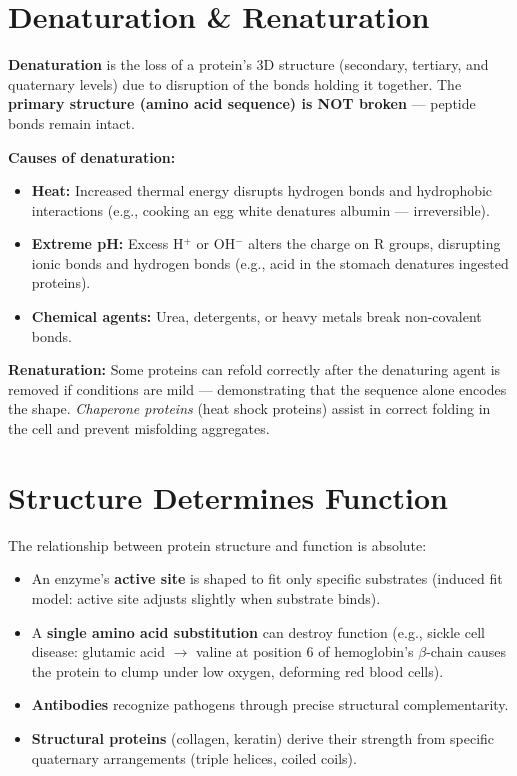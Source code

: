 \documentclass[11pt, letterpaper]{article}
\begin{document}
\section*{Denaturation \& Renaturation}

\textbf{Denaturation} is the loss of a protein's 3D structure (secondary, tertiary, and
quaternary levels) due to disruption of the bonds holding it together. The \textbf{primary
structure (amino acid sequence) is NOT broken} --- peptide bonds remain intact.

\textbf{Causes of denaturation:}
\begin{itemize}[noitemsep]
  \item \textbf{Heat:} Increased thermal energy disrupts hydrogen bonds and hydrophobic
        interactions (e.g., cooking an egg white denatures albumin --- irreversible).
  \item \textbf{Extreme pH:} Excess H$^+$ or OH$^-$ alters the charge on R groups, disrupting
        ionic bonds and hydrogen bonds (e.g., acid in the stomach denatures ingested proteins).
  \item \textbf{Chemical agents:} Urea, detergents, or heavy metals break non-covalent bonds.
\end{itemize}

\textbf{Renaturation:} Some proteins can refold correctly after the denaturing agent is
removed if conditions are mild --- demonstrating that the sequence alone encodes the shape.
\textit{Chaperone proteins} (heat shock proteins) assist in correct folding in the cell and
prevent misfolding aggregates.

\section*{Structure Determines Function}

\begin{tcolorbox}[colback=partbg, colframe=sectionblue, arc=3pt, boxrule=1pt]
The relationship between protein structure and function is absolute:
\begin{itemize}[noitemsep, leftmargin=*]
  \item An enzyme's \textbf{active site} is shaped to fit only specific substrates (induced
        fit model: active site adjusts slightly when substrate binds).
  \item A \textbf{single amino acid substitution} can destroy function (e.g., sickle cell
        disease: glutamic acid $\to$ valine at position 6 of hemoglobin's $\beta$-chain
        causes the protein to clump under low oxygen, deforming red blood cells).
  \item \textbf{Antibodies} recognize pathogens through precise structural complementarity.
  \item \textbf{Structural proteins} (collagen, keratin) derive their strength from specific
        quaternary arrangements (triple helices, coiled coils).
\end{itemize}
\end{tcolorbox}
\end{document}
